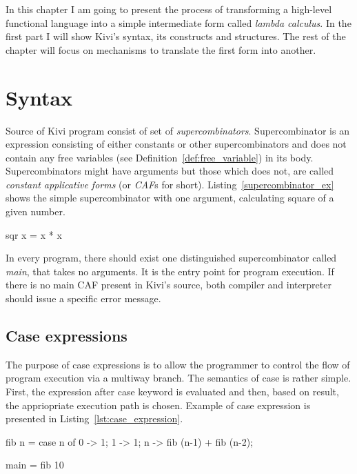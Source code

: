 \documentclass[12pt,a4paper]{report}
\begin{document}
In this chapter I am going to present the process of transforming a high-level
functional language into a simple intermediate form called \textit{lambda
calculus}. In the first part I will show Kivi's syntax, its constructs and
structures. The rest of the chapter will focus on mechanisms to translate the
first form into another.

\section{Syntax}
Source of Kivi program consist of set of
\textit{supercombinators}\cite{wiki:supercombinator}. Supercombinator is an
expression consisting of either constants or other supercombinators and does
not contain any free variables (see Definition~\ref{def:free_variable}) in its
body. Supercombinators might have arguments but those which does not, are
called \textit{constant applicative forms} (or \textit{CAF}s for short).
Listing~\ref{supercombinator_ex} shows the simple supercombinator with one
argument, calculating square of a given number.

\vspace*{0.2in}
\begin{code}[style=haskell,label=supercombinator_ex,caption={Simple supercombinator.}]
  sqr x = x * x
\end{code}

In every program, there should exist one distinguished supercombinator called
\textit{main}, that takes no arguments. It is the entry point for program
execution. If there is no main CAF present in Kivi's source, both compiler and
interpreter should issue a specific error message.

\subsection{Case expressions}
The purpose of case expressions is to allow the programmer to control the flow
of program execution via a multiway branch. The semantics of case is rather
simple. First, the expression after case keyword is evaluated and then, based
on result, the appriopriate execution path is chosen. Example of case
expression is presented in Listing~\ref{lst:case_expression}.

\vspace*{0.2in}
\begin{code}[style=haskell,label=lst:case_expression,caption={Fibonacci with case}]
  fib n =
      case n of
          0 -> 1;
          1 -> 1;
          n -> fib (n-1) + fib (n-2);

  main = fib 10
\end{code}
\end{document}
